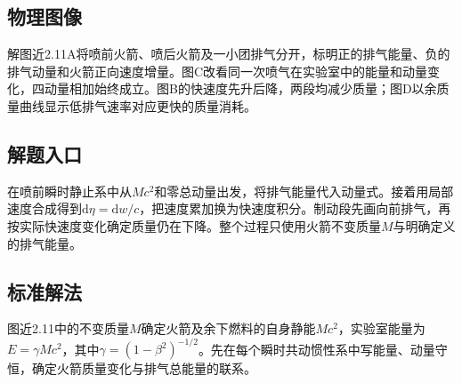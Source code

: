 \documentclass[UTF8,fontset=fandol,a4paper,11pt]{ctexart}
\begin{document}


\subsection*{物理图像}

解图近2.11A将喷前火箭、喷后火箭及一小团排气分开，标明正的排气能量、负的排气动量和火箭正向速度增量。图C改看同一次喷气在实验室中的能量和动量变化，四动量相加始终成立。图B的快速度先升后降，两段均减少质量；图D以余质量曲线显示低排气速率对应更快的质量消耗。



\subsection*{解题入口}

在喷前瞬时静止系中从$Mc^2$和零总动量出发，将排气能量代入动量式。接着用局部速度合成得到$\mathrm d\eta=\mathrm dw/c$，把速度累加换为快速度积分。制动段先画向前排气，再按实际快速度变化确定质量仍在下降。整个过程只使用火箭不变质量$M$与明确定义的排气能量。



\subsection*{标准解法}


图近2.11中的不变质量$M$确定火箭及余下燃料的自身静能$Mc^2$，实验室能量为$E=\gamma Mc^2$，其中$\gamma=(1-\beta^2)^{-1/2}$。先在每个瞬时共动惯性系中写能量、动量守恒，确定火箭质量变化与排气总能量的联系。
\end{document}
